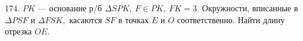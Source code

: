 174. $PK$ --- основание р/б $\Delta SPK,\ F\in PK,\ FK=3.$ Окружности, вписанные в $\Delta PSF$ и $\Delta FSK,$ касаются $SF$ в точках $E$ и $O$ соответственно. Найти длину отрезка $OE.$\\
